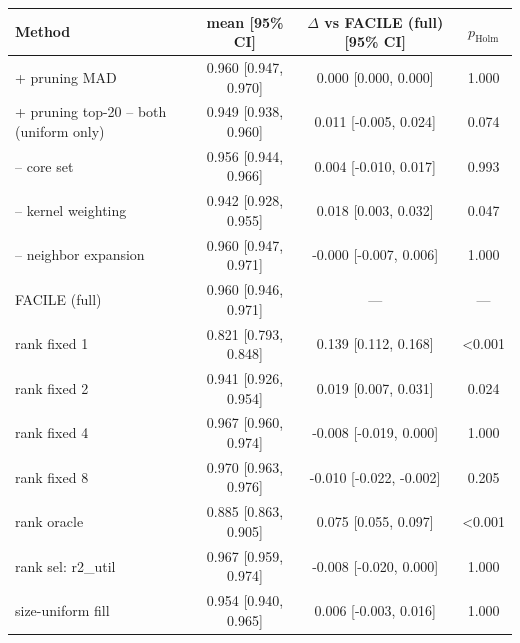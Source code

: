 \begin{tabular}{lccc}
\toprule
Method & mean [95\% CI] & $\Delta$ vs FACILE (full) [95\% CI] & $p_{\mathrm{Holm}}$ \\
\midrule
+ pruning MAD & 0.960 [0.947, 0.970] & 0.000 [0.000, 0.000] & 1.000 \\
+ pruning top-20%
-- both (uniform only) & 0.949 [0.938, 0.960] & 0.011 [-0.005, 0.024] & 0.074 \\
-- core set & 0.956 [0.944, 0.966] & 0.004 [-0.010, 0.017] & 0.993 \\
-- kernel weighting & 0.942 [0.928, 0.955] & 0.018 [0.003, 0.032] & 0.047 \\
-- neighbor expansion & 0.960 [0.947, 0.971] & -0.000 [-0.007, 0.006] & 1.000 \\
FACILE (full) & 0.960 [0.946, 0.971] & --- & --- \\
rank fixed 1 & 0.821 [0.793, 0.848] & 0.139 [0.112, 0.168] & <0.001 \\
rank fixed 2 & 0.941 [0.926, 0.954] & 0.019 [0.007, 0.031] & 0.024 \\
rank fixed 4 & 0.967 [0.960, 0.974] & -0.008 [-0.019, 0.000] & 1.000 \\
rank fixed 8 & 0.970 [0.963, 0.976] & -0.010 [-0.022, -0.002] & 0.205 \\
rank oracle & 0.885 [0.863, 0.905] & 0.075 [0.055, 0.097] & <0.001 \\
rank sel: r2_util & 0.967 [0.959, 0.974] & -0.008 [-0.020, 0.000] & 1.000 \\
size-uniform fill & 0.954 [0.940, 0.965] & 0.006 [-0.003, 0.016] & 1.000 \\
\bottomrule
\end{tabular}

